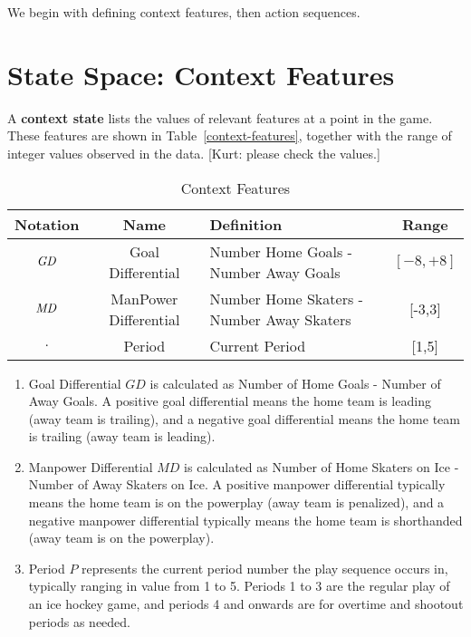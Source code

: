 \documentclass[]{article}
\begin{document}
We begin with defining context features, then action sequences.


\section{State Space: Context Features} \label{sec:context} A \textbf{context state} lists the values of relevant features at a point in the game. These features are shown in Table~\ref{context-features}, together with the range of integer values observed in the data. [Kurt: please check the values.]

\begin{table}[htdp]
\caption{Context Features}
\begin{center}
\begin{tabular}{|c|c|p{2cm}|c|}
Notation & Name & Definition & Range \\\hline
$\it{GD}$ & Goal Differential & Number Home Goals - Number Away Goals & $ [-8,+8]$\\
$\it{MD}$ & ManPower Differential & Number Home Skaters - Number Away Skaters & [-3,3]\\
$\period$ & Period & Current Period & [1,5]\\\hline
\end{tabular}
\end{center}
\label{default}
\end{table}%

\begin{enumerate}
\item Goal Differential $GD$ is calculated as Number of Home Goals - Number of Away Goals. A positive goal differential means the home team is leading (away team is trailing), and a negative goal differential means the home team is trailing (away team is leading).
\item Manpower Differential $MD$ is calculated as Number of Home Skaters on Ice - Number of Away Skaters on Ice. A positive manpower differential typically means the home team is on the powerplay (away team is penalized), and a negative manpower differential typically means the home team is shorthanded (away team is on the powerplay).
\item Period $P$ represents the current period number the play sequence occurs in, typically ranging in value from 1 to 5. Periods 1 to 3 are the regular play of an ice hockey game, and periods 4 and onwards are for overtime and shootout periods as needed.
\end{enumerate}
\end{document}
